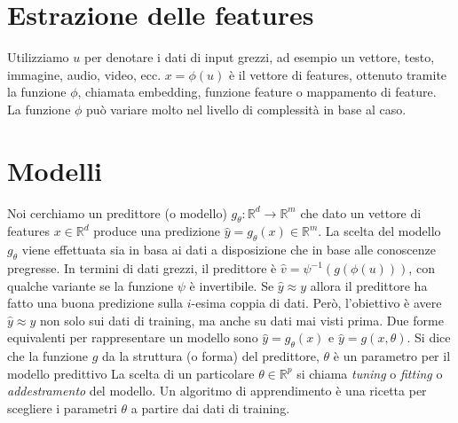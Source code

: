 \section{Estrazione delle features}
Utilizziamo $u$ per denotare i dati di input grezzi, ad esempio un vettore, testo, immagine, audio, video, ecc.
$x=\phi(u)$ è il vettore di features, ottenuto tramite la funzione $\phi$, chiamata embedding, funzione feature o mappamento di feature. La funzione $\phi$ può variare molto nel livello di complessità in base al caso.
\section{Modelli}
Noi cerchiamo un predittore (o modello) $g_\theta:\mathbb{R}^d\to \mathbb{R}^m$ che dato un vettore di features $x\in \mathbb{R}^d$ produce una predizione $\hat{y}=g_\theta(x)\in \mathbb{R}^m$.
La scelta del modello $g_\theta$ viene effettuata sia in basa ai dati a disposizione che in base alle conoscenze pregresse.
In termini di dati grezzi, il predittore è  $\hat{v}=\psi^{-1}(g(\phi(u)))$, con qualche variante se la funzione $\psi$ è invertibile.
Se $\hat{y}\approx y$ allora il predittore ha fatto una buona predizione sulla $i$-esima coppia di dati. Però, l'obiettivo è avere $\hat{y}\approx y$ non solo sui dati di training, ma anche su dati mai visti prima.
Due forme equivalenti per rappresentare un modello sono $\hat{y}=g_\theta(x)$ e $\hat{y}=g(x,\theta)$. Si dice che la funzione $g$ da la struttura (o forma) del predittore, $\theta$ è un parametro per il modello predittivo
La scelta di un particolare $\theta\in \mathbb{R}^p$ si chiama \textit{tuning} o \textit{fitting} o \textit{addestramento} del modello.
Un algoritmo di apprendimento è una ricetta per scegliere i parametri $\theta$ a partire dai dati di training.
